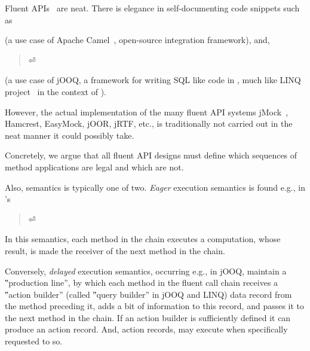 Fluent APIs~\cite{VanDeursen:Klint:2000,Hudak:1997,Fowler:2010} are
neat. There is elegance in self-documenting code snippets such as
\begin{quote}
  \label{figure:DSL}
  \parbox[c]{44ex}{}
\end{quote}
(a use case of Apache Camel~\cite{Ibsen:Anstey:10}, open-source integration
framework), and,
\begin{quote}
  \parbox[c]{53ex}{}⏎
\end{quote}
(a use case of jOOQ, a framework for writing
SQL like code in \Java, much like LINQ project~\cite{Meijer:Beckman:Bierman:06}
in the context of \CSharp).

However, the actual implementation of the many fluent API systems
jMock~\cite{Freeman:Pryce:06},
Hamcrest,
EasyMock,
jOOR,
jRTF,
etc., is traditionally not carried out
in the neat manner it could possibly take.

Concretely, we argue that all fluent API designs
must define which sequences of method applications are legal
and which are not.

Also, semantics is typically one of two.
\emph{Eager} execution semantics is
found e.g., in \Java's

\begin{quote}
  \parbox[c]{53ex}{}⏎
\end{quote}

In this semantics, each method in the chain executes a computation,
  whose result, is made the receiver of the next method
  in the chain.

Conversely, \emph{delayed} execution semantics, occurring e.g., in jOOQ,
  maintain a ‟production line”,
  by which each method in the fluent call chain receives a
  ‟action builder” (called ‟query builder” in jOOQ and LINQ)
  data record from the method preceding it, adds a bit of
  information to this record, and passes it to the next method
  in the chain.
If an action builder is sufficiently defined it can
  produce an action record.
And, action records, may execute
  when specifically requested to so.


